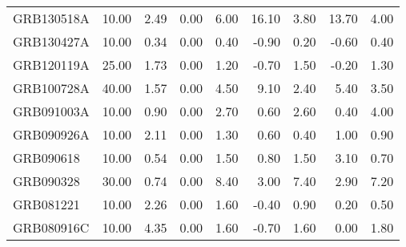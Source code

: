 \begin{tabular}{lrrrrrrrr}
GRB130518A & 10.00 & 2.49 & 0.00 & 6.00 & 16.10 & 3.80 & 13.70 & 4.00 \\
GRB130427A & 10.00 & 0.34 & 0.00 & 0.40 & -0.90 & 0.20 & -0.60 & 0.40 \\
GRB120119A & 25.00 & 1.73 & 0.00 & 1.20 & -0.70 & 1.50 & -0.20 & 1.30 \\
GRB100728A & 40.00 & 1.57 & 0.00 & 4.50 & 9.10 & 2.40 & 5.40 & 3.50 \\
GRB091003A & 10.00 & 0.90 & 0.00 & 2.70 & 0.60 & 2.60 & 0.40 & 4.00 \\
GRB090926A & 10.00 & 2.11 & 0.00 & 1.30 & 0.60 & 0.40 & 1.00 & 0.90 \\
GRB090618 & 10.00 & 0.54 & 0.00 & 1.50 & 0.80 & 1.50 & 3.10 & 0.70 \\
GRB090328 & 30.00 & 0.74 & 0.00 & 8.40 & 3.00 & 7.40 & 2.90 & 7.20 \\
GRB081221 & 10.00 & 2.26 & 0.00 & 1.60 & -0.40 & 0.90 & 0.20 & 0.50 \\
GRB080916C & 10.00 & 4.35 & 0.00 & 1.60 & -0.70 & 1.60 & 0.00 & 1.80 \\
\bottomrule
\end{tabular}
